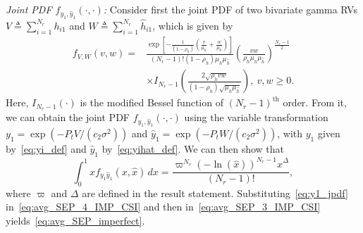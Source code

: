 \documentclass[journal]{IEEEtran}
\newcommand{\define}{\triangleq}
\newcommand{\muh}{{\mu_{h}}}
\newcommand{\Nr}{{N_r}}
\newcommand{\Pt}{{P_t}}
\newcommand{\such}{h}
\newcommand{\hk}[1]{{\such_{#1}}}
\newcommand{\noisevar}{\sigma^2}
\newcommand{\ctwo}{c_{2}}
\newcommand{\yk}[1]{y_{#1}}
\newcommand{\hhat}{\hat{\such}}
\newcommand{\hkhat}[1]{\hhat_{#1}}
\newcommand{\ykhat}[1]{\hat{y}_{#1}}
\newcommand{\muhhat}{\mu_{\hhat}}
\newcommand{\rhoh}{\rho_h}
\newcommand{\T}{\varpi}
\newcommand{\xhat}{\hat{x}}
\newcommand{\sumnr}{\sum_{i=1}^{\Nr}}
\newcommand{\D}{\Delta}
\begin{document}
{\em Joint PDF $f_{\yk{1},\ykhat{1}}\left(\cdot,\cdot\right)$:} Consider first the joint PDF of two bivariate gamma RVs $V\define\sumnr\hk{i1}$ and $W\define\sumnr\hkhat{i1}$, which is given by~\cite[eq. (6.1)]{simon_alouini_book}
\begin{align}
\label{eq:bivargammaPDF}
\!f_{V,W}(v,w) = & \frac{\exp\left[{-\frac{1}{(1-\rhoh)}\left( \frac{v}{\muh}+\frac{w}{\muhhat}\right) } \right]}{(\Nr-1)! \left(1-\rhoh \right)\muh\muhhat }\left(\frac{vw}{\rhoh \muh\muhhat}\right)^{\frac{\Nr-1}{2}} \nonumber\\
&\times I_{\Nr-1}\left(\frac{2\sqrt{\rhoh vw}}{(1-\rhoh)\sqrt{\muh\muhhat}}\right)\!,~v, w \geq 0.
\end{align}
%  
Here, $I_{\Nr-1}\left(\cdot \right) $ is the modified Bessel function of $(\Nr-1)^{\text{th}}$ order. From it, we can obtain the joint PDF $f_{\yk{1},\ykhat{1}}\left(\cdot,\cdot\right)$ using the variable transformation $\yk{1}=\exp\left(-\Pt V/(\ctwo\noisevar)\right)$ and $\ykhat{1}=\exp\left(-\Pt W/(\ctwo\noisevar) \right)$, with $\yk{1}$ given by~\eqref{eq:yi_def} and $\ykhat{1}$ by~\eqref{eq:yihat_def}.  
We can then show that 
%
\begin{equation}
\label{eq:y1_jpdf}
\int_{0}^{1} x f_{\yk{1}\ykhat{1}}\left(x,\xhat\right)\,dx = \frac{\T^{\Nr}\left(-\ln\left({\xhat} \right)\right)^{\Nr-1}\xhat^{\D}}{(\Nr-1)!},
\end{equation}
where $\T$ and $\D$ are defined in the result statement. Substituting~\eqref{eq:y1_jpdf}  in~\eqref{eq:avg_SEP_4_IMP_CSI} and then in~\eqref{eq:avg_SEP_3_IMP_CSI}  yields~\eqref{eq:avg_SEP_imperfect}.
\end{document}
